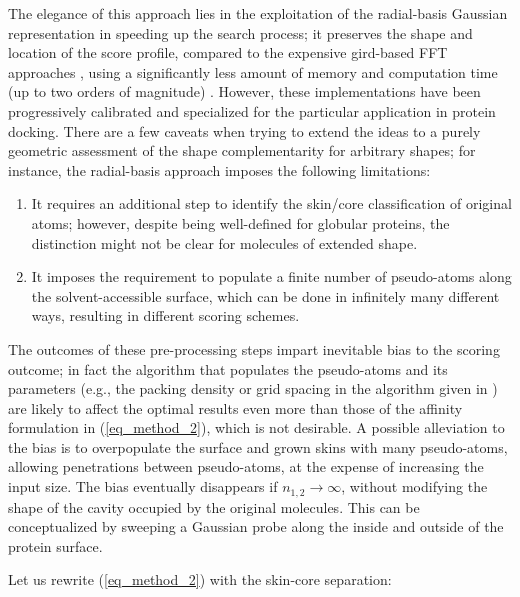 \documentclass[article]{gmp2014}
\theoremstyle{definition}
\begin{document}
The elegance of this approach lies in the exploitation of the radial-basis Gaussian representation in speeding up the search process; it preserves the shape and location of the score profile, compared to the expensive gird-based FFT approaches \cite{Eisenstein2004}, using a significantly less amount of memory and computation time (up to two orders of magnitude) \cite{Bajaj2006}.
%
However, these implementations have been progressively calibrated and specialized for the particular application in protein docking. There are a few caveats when trying to extend the ideas to a purely geometric assessment of the shape complementarity for arbitrary shapes; for instance, the radial-basis approach imposes the following limitations:
%
\begin{enumerate}
    \item It requires an additional step to identify the skin/core classification of original atoms; however, despite being well-defined for globular proteins, the distinction might not be clear for molecules of extended shape.
    \item It imposes the requirement to populate a finite number of pseudo-atoms along the solvent-accessible surface, which can be done in infinitely many different ways, resulting in different scoring schemes.
\end{enumerate}
%
The outcomes of these pre-processing steps impart inevitable bias to the scoring outcome; in fact the algorithm that populates the pseudo-atoms and its parameters (e.g., the packing density or grid spacing in the algorithm given in \cite{Candas2005}) are likely to affect the optimal results even more than those of the affinity formulation in (\ref{eq_method_2}), which is not desirable.
%
A possible alleviation to the bias is to overpopulate the surface and grown skins with many pseudo-atoms, allowing penetrations between pseudo-atoms, at the expense of increasing the input size. The bias eventually disappears if $n_{1,2} \rightarrow \infty$, without modifying the shape of the cavity occupied by the original molecules.
%
This can be conceptualized by sweeping a Gaussian probe along the inside and outside of the protein surface.

Let us rewrite (\ref{eq_method_2}) with the skin-core separation:
\end{document}
